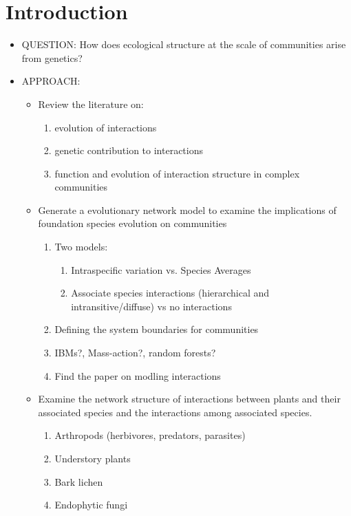 \documentclass[12pt]{article}
\begin{document}
\section{Introduction}
\begin{itemize}
\item QUESTION: How does ecological structure at the scale of
  communities arise from genetics?
\item APPROACH:
  \begin{itemize}
  \item Review the literature on:
    \begin{enumerate}
    \item evolution of interactions
    \item genetic contribution to interactions
    \item function and evolution of interaction structure in complex
      communities
    \end{enumerate}
  \item Generate a evolutionary network model to examine the
    implications of foundation species evolution on communities
    \begin{enumerate}
    \item Two models:
      \begin{enumerate}
      \item Intraspecific variation vs. Species Averages
      \item Associate species interactions (hierarchical and intransitive/diffuse) vs no interactions
      \end{enumerate}
    \item Defining the system boundaries for communities
    \item IBMs?, Mass-action?, random forests?
    \item Find the paper on modling interactions
    \end{enumerate}
  \item Examine the network structure of interactions between plants
    and their associated species and the interactions among associated
    species.
    \begin{enumerate}
    \item Arthropods (herbivores, predators, parasites)
    \item Understory plants
    \item Bark lichen
    \item Endophytic fungi
    \end{enumerate}
  \end{itemize}

\end{itemize}
\end{document}
